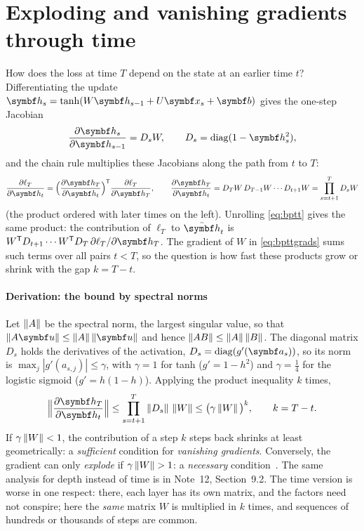 \documentclass[11pt]{article}
\newcommand{\hv}{\vect{h}}
\newcommand{\av}{\vect{a}}
\newcommand{\bv}{\vect{b}}
\newcommand{\diag}{\operatorname{diag}}
\begin{document}
\section{Exploding and vanishing gradients through time}\label{sec:vanish}

How does the loss at time $T$ depend on the state at an earlier time $t$? Differentiating the update
$\hv_s = \tanh(W\hv_{s-1} + U\x_s + \bv)$ gives the one-step Jacobian
\[
  \frac{\partial \hv_s}{\partial \hv_{s-1}} = D_s W, \qquad D_s = \diag(1 - \hv_s^2) ,
\]
and the chain rule multiplies these Jacobians along the path from $t$ to $T$:
\begin{equation}\label{eq:jacprod}
  \frac{\partial \ell_T}{\partial \hv_t} = \Big(\frac{\partial \hv_T}{\partial \hv_t}\Big)\T\frac{\partial\ell_T}{\partial\hv_T},
  \qquad
  \frac{\partial \hv_T}{\partial \hv_t} = D_T W\, D_{T-1}W \cdots D_{t+1}W = \prod_{s=t+1}^{T} D_sW
\end{equation}
(the product ordered with later times on the left). Unrolling \eqref{eq:bptt} gives the same product: the contribution of
$\ell_T$ to $\bar{\hv}_t$ is $W\T D_{t+1} \cdots W\T D_T\,\partial\ell_T/\partial\hv_T$. The gradient of $W$ in
\eqref{eq:bpttgrads} sums such terms over all pairs $t < T$, so the question is how fast these products grow or shrink
with the gap $k = T - t$.

\paragraph{Derivation: the bound by spectral norms} Let $\left\lVert A \right\rVert$ be the spectral norm, the largest singular value, so
that $\norm{A\vect{u}} \le \norm{A}\norm{\vect{u}}$ and hence $\left\lVert AB \right\rVert \le \left\lVert A \right\rVert\left\lVert B \right\rVert$. The diagonal matrix $D_s$ holds
the derivatives of the activation, $D_s = \diag(g'(\av_s))$, so its norm is $\max_j|g'(a_{s,j})| \le \gamma$, with
$\gamma = 1$ for tanh ($g' = 1 - h^2$) and $\gamma = \frac14$ for the logistic sigmoid ($g' = h(1 - h)$). Applying the
product inequality $k$ times,
\begin{equation}\label{eq:bound}
  \Big\lVert\frac{\partial \hv_T}{\partial \hv_t}\Big\rVert \le \prod_{s=t+1}^{T} \norm{D_s}\,\norm{W}
  \le \big(\gamma\norm{W}\big)^{k}, \qquad k = T - t .
\end{equation}
If $\gamma\left\lVert W \right\rVert < 1$, the contribution of a step $k$ steps back shrinks at least geometrically: a \emph{sufficient}
condition for \emph{vanishing gradients}. Conversely, the gradient can only \emph{explode} if $\gamma\left\lVert W \right\rVert > 1$: a
\emph{necessary} condition~\cite{bengio1994,pascanu2013}. The same analysis for depth instead of time is in Note~12,
Section~9.2. The time version is worse in one respect: there, each layer has its own matrix, and the factors need not
conspire; here the \emph{same} matrix $W$ is multiplied in $k$ times, and sequences of hundreds or thousands of steps are
common.
\end{document}
